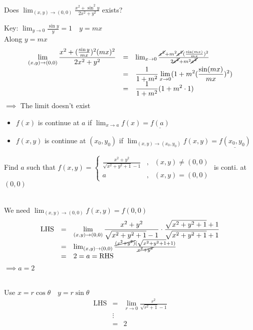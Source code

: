 \begin{eg} 
Does \(\displaystyle \lim_{(x, y) \to (0, 0)} \frac{x^2 + \sin^2 y}{2x^2 + y^2}\) exists?

\soln Key: \(\displaystyle \lim_{y \to 0} \frac{\sin y}{y} = 1 \quad y = mx\)\\
Along \(y = mx\)
\[\begin{array}{rcl}
\displaystyle \lim_{(x, y) \to (0, 0)} \frac{x^2 + (\frac{\sin y}{mx})^2(mx)^2}{2x^2 + y^2} & = & \lim_{x \to 0} \frac{\cancel{x^2} +m^2\cancel{x^2}(\frac{\sin (mx)}{mx})^2}{2\cancel{x^2} + m^2\cancel{x^2}}\\
& = & \displaystyle \frac{1}{1 + m^2} \lim_{x \to 0} (1 + m^2 (\frac{\sin (mx)}{mx})^2)\\
& = & \displaystyle \frac{1}{1 + m^2}(1 + m^2 \cdot 1)
\end{array}\]
\(\implies\) The limit doesn't exist
\end{eg}
\begin{notn}
\begin{itemize}
\item \(f(x)\) is continue at \(a\) if \(\displaystyle \lim_{x \to a} f(x) = \underline{f(a)}\)
\item \(f(x, y)\) is continue at \((x_0, y_0)\) if \(\displaystyle \lim_{(x, y) \to (x_0, y_0)} f(x, y) = \underline{f(x_0, y_0)}\)
\end{itemize}
\end{notn}
\begin{eg} 
Find \(a\) such that \(f(x, y) = \left\{ \begin{array}{ccl}
\displaystyle \frac{x^2 + y^2}{\sqrt{x^2 + y^2 + 1} - 1} &, & (x, y) \neq (0, 0)\\
a &, & (x, y) = (0, 0)
\end{array}\right.\) is conti. at \((0, 0)\)

\\
We need \(\displaystyle \lim_{(x, y) \to (0, 0)}f(x, y) = f(0, 0)\)
\[\begin{array}{rcl}
\text{LHS} & = & \displaystyle \lim_{(x, y) \to (0, 0)} \frac{x^2 + y^2}{\sqrt{x^2 + y^2 + 1} - 1} \cdot \frac{\sqrt{x^2 + y^2 + 1} + 1}{\sqrt{x^2 + y^2 + 1} + 1}\\
& = & \lim_{(x, y) \to (0, 0)} \frac{\cancel{(x^2 + y^2)} (\sqrt{x^2 + y^2 + 1} + 1)}{\cancel{x^2 + y^2}}\\
& = & 2 = a = \text{RHS}
\end{array}\]
\(\implies a = 2\)

\\
Use \(x = r \cos \theta \quad y = r \sin \theta\)
\[\begin{array}{rcl}
\text{LHS} & = & \displaystyle \lim_{r \to 0} \frac{r^2}{\sqrt{r^2 + 1} - 1}\\
& \vdots &\\
& = & 2
\end{array}\]
\end{eg}
